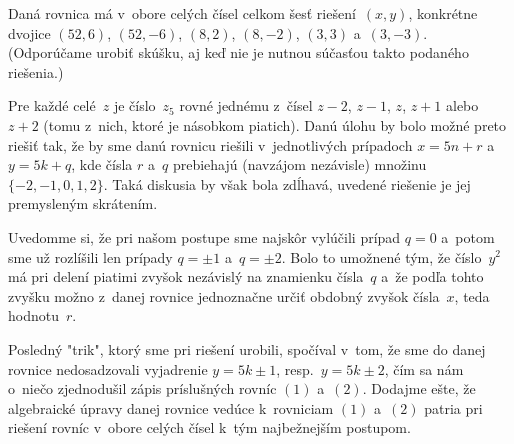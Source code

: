{\odpoved
Daná rovnica má v~obore celých čísel celkom šesť
riešení~$(x,y)$, konkrétne dvojice $(52,6)$, $(52,{-6})$, $(8,2)$, $(8,{-2})$,
$(3,3)$ a~$(3,{-3})$. (Odporúčame urobiť skúšku,
aj keď nie je nutnou súčasťou takto podaného riešenia.)

\poznamka
Pre každé celé~$z$ je číslo~$z_5$ rovné jednému
z~čísel $z-2$, $z-1$, $z$, $z+1$ alebo $z+2$ (tomu z~nich, ktoré
je násobkom piatich). Danú úlohu by bolo možné preto riešiť tak, že
by sme danú rovnicu riešili v~jednotlivých prípadoch $x=5n+r$
a~$y=5k+q$, kde čísla $r$ a~$q$ prebiehajú (navzájom nezávisle)
množinu $\{{-2},{-1},0,1,2\}$. Taká diskusia by však bola
zdĺhavá, uvedené riešenie je jej premysleným skrátením.

Uvedomme si, že pri našom postupe sme najskôr vylúčili prípad
$q=0$ a~potom sme už rozlíšili len prípady $q=\pm1$
a~$q=\pm2$. Bolo to umožnené tým, že číslo~$y^2$ má pri delení piatimi
zvyšok nezávislý na znamienku čísla~$q$ a~že podľa tohto zvyšku
možno z~danej rovnice jednoznačne určiť obdobný zvyšok čísla~$x$,
teda hodnotu~$r$.

Posledný "trik", ktorý sme pri riešení urobili, spočíval v~tom,
že sme do danej rovnice nedosadzovali vyjadrenie $y=5k\pm1$,
resp.~$y=5k\pm2$, čím sa nám o~niečo zjednodušil zápis
príslušných rovníc $(1)$ a~$(2)$. Dodajme ešte, že algebraické
úpravy danej rovnice vedúce k~rovniciam $(1)$ a~$(2)$ patria pri riešení
rovníc v~obore celých čísel k~tým najbežnejším postupom.}

